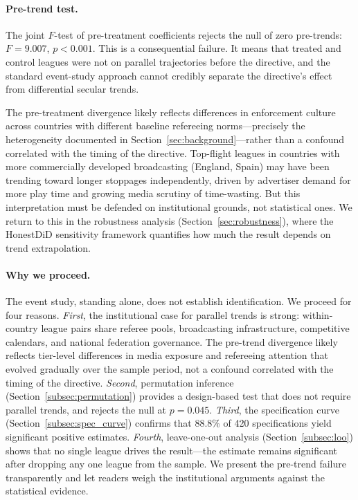 \paragraph{Pre-trend test.} The joint $F$-test of pre-treatment coefficients rejects the null of zero pre-trends: $F = 9.007$, $p < 0.001$. This is a consequential failure. It means that treated and control leagues were not on parallel trajectories before the directive, and the standard event-study approach cannot credibly separate the directive's effect from differential secular trends.

The pre-treatment divergence likely reflects differences in enforcement culture across countries with different baseline refereeing norms---precisely the heterogeneity documented in Section~\ref{sec:background}---rather than a confound correlated with the timing of the directive. Top-flight leagues in countries with more commercially developed broadcasting (England, Spain) may have been trending toward longer stoppages independently, driven by advertiser demand for more play time and growing media scrutiny of time-wasting. But this interpretation must be defended on institutional grounds, not statistical ones. We return to this in the robustness analysis (Section~\ref{sec:robustness}), where the HonestDiD sensitivity framework \citep{rambachan2023more} quantifies how much the result depends on trend extrapolation.

\paragraph{Why we proceed.} The event study, standing alone, does not establish identification. We proceed for four reasons. \textit{First}, the institutional case for parallel trends is strong: within-country league pairs share referee pools, broadcasting infrastructure, competitive calendars, and national federation governance. The pre-trend divergence likely reflects tier-level differences in media exposure and refereeing attention that evolved gradually over the sample period, not a confound correlated with the timing of the directive. \textit{Second}, permutation inference (Section~\ref{subsec:permutation}) provides a design-based test that does not require parallel trends, and rejects the null at $p = 0.045$. \textit{Third}, the specification curve (Section~\ref{subsec:spec_curve}) confirms that 88.8\% of 420 specifications yield significant positive estimates. \textit{Fourth}, leave-one-out analysis (Section~\ref{subsec:loo}) shows that no single league drives the result---the estimate remains significant after dropping any one league from the sample. We present the pre-trend failure transparently and let readers weigh the institutional arguments against the statistical evidence.



